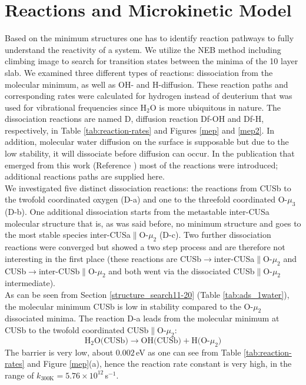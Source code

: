 \documentclass[11pt,DIV=13,BCOR=5mm,a4paper,headinclude]{scrbook}
\begin{document}
\section{Reactions and Microkinetic Model}\label{reactions}
Based on the minimum structures one has to identify reaction pathways to fully understand the reactivity of a system.
 We utilize the NEB method including climbing image to search for transition states between the minima of the 10 layer slab.
We examined three different types of reactions: dissociation from the molecular minimum, as well as OH- and H-diffusion.
These reaction paths and corresponding rates were calculated for hydrogen instead of deuterium that was used for vibrational frequencies since H$_2$O is more ubiquitous in nature.
The dissociation reactions are named D, diffusion reaction Df-OH and Df-H, respectively, in Table \ref{tab:reaction-rates} and Figures \ref{mep} and \ref{mep2}.
In addition, molecular water diffusion on the surface is supposable but due to the low stability, it will dissociate before diffusion can occur.
In the publication that emerged from this work (Reference \cite{Heiden11-20_2018}) most of the reactions were introduced; additional reactions paths are supplied here.
\\
We investigated five distinct dissociation reactions: the reactions from CUSb to the twofold coordinated oxygen (D-a) and one to the threefold coordinated O-$\mu_3$ (D-b).
One additional dissociation starts from the metastable inter-CUSa molecular structure that is, as was said before, no minimum structure and goes to the most stable species inter-CUSa$\parallel$O-$\mu_2$ (D-c).
Two further dissociation reactions were converged but showed a two step process and are therefore not interesting in the first place (these reactions are CUSb$\rightarrow$inter-CUSa$\parallel$O-$\mu_2$ and CUSb$\rightarrow$inter-CUSb$\parallel$O-$\mu_2$ and both went via the dissociated CUSb$\parallel$O-$\mu_2$ intermediate).
\\
As can be seen from Section \ref{structure_search11-20} (Table \ref{tab:ads_1water}), the molecular minimum CUSb is low in stability compared to the O-$\mu_2$ dissociated minima.
The reaction D-a leads from the molecular minimum at CUSb to the twofold coordinated CUSb$\parallel$O-$\mu_2$:
 \begin{equation}
 \text{H$_2$O(CUSb)} \rightarrow \text{OH(CUSb)} + \text{H(O-$\mu_2$)} \tag{D-a}
      \label{dissa}
\end{equation}
The barrier is very low, about $0.002\,$eV as one can see from Table \ref{tab:reaction-rates} and Figure \ref{mep}(a), hence the reaction rate constant is very high, in the range of $k_{\text{300K}}=5.76\times 10^{12}\,$s$^{-1}$.
\end{document}
